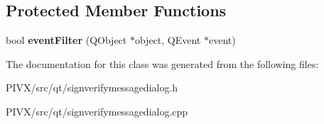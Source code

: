 \subsection*{Protected Member Functions}
\begin{DoxyCompactItemize}
\item 
\mbox{\label{class_sign_verify_message_dialog_a0e6755f1a4f2688b8e3b24a1f9b118b0}} 
bool {\bfseries event\+Filter} (Q\+Object $\ast$object, Q\+Event $\ast$event)
\end{DoxyCompactItemize}


The documentation for this class was generated from the following files\+:\begin{DoxyCompactItemize}
\item 
P\+I\+V\+X/src/qt/signverifymessagedialog.\+h\item 
P\+I\+V\+X/src/qt/signverifymessagedialog.\+cpp\end{DoxyCompactItemize}
